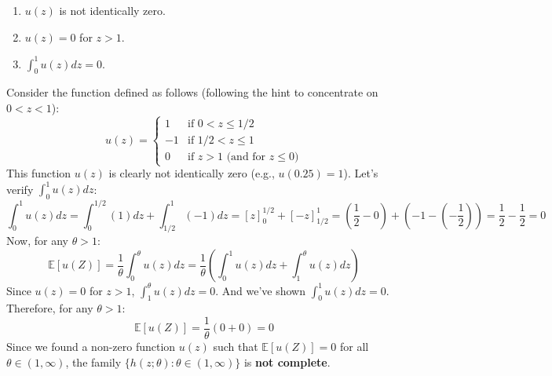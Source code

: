 \begin{enumerate}
	\item $u(z)$ is not identically zero.
	\item $u(z) = 0$ for $z > 1$.
	\item $\int_0^1 u(z) dz = 0$.
\end{enumerate}

Consider the function defined as follows (following the hint to concentrate on $0 < z < 1$):
\[
u(z) = \begin{cases} 1 & \text{if } 0 < z \le 1/2 \\ -1 & \text{if } 1/2 < z \le 1 \\ 0 & \text{if } z > 1 \text{ (and for } z \le 0) \end{cases}
\]
This function $u(z)$ is clearly not identically zero (e.g., $u(0.25) = 1$).
Let's verify $\int_0^1 u(z) dz$:
\[
\int_0^1 u(z) dz = \int_0^{1/2} (1) dz + \int_{1/2}^1 (-1) dz = [z]_0^{1/2} + [-z]_{1/2}^1 = \left(\frac{1}{2} - 0\right) + \left(-1 - \left(-\frac{1}{2}\right)\right) = \frac{1}{2} - \frac{1}{2} = 0
\]
Now, for any $\theta > 1$:
\[
\mathbb{E}[u(Z)] = \frac{1}{\theta} \int_0^\theta u(z) dz = \frac{1}{\theta} \left( \int_0^1 u(z) dz + \int_1^\theta u(z) dz \right)
\]
Since $u(z) = 0$ for $z > 1$, $\int_1^\theta u(z) dz = 0$. And we've shown $\int_0^1 u(z) dz = 0$.
Therefore, for any $\theta > 1$:
\[
\mathbb{E}[u(Z)] = \frac{1}{\theta} (0 + 0) = 0
\]
Since we found a non-zero function $u(z)$ such that $\mathbb{E}[u(Z)] = 0$ for all $\theta \in (1, \infty)$, the family $\{h(z;\theta):\theta\in(1,\infty)\}$ is \textbf{not complete}.


